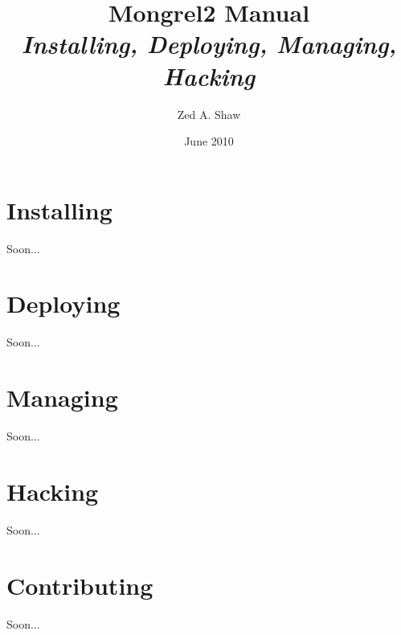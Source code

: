 


\title{
    Mongrel2 Manual\\
    {\it Installing, Deploying, Managing, Hacking}
}
\author{Zed A. Shaw}
\date{June 2010}



\maketitle




\tableofcontents




\part{Installing}

Soon...

\part{Deploying}

Soon...

\part{Managing}

Soon...

\part{Hacking}

Soon...

\part{Contributing}

Soon...

\appendix



